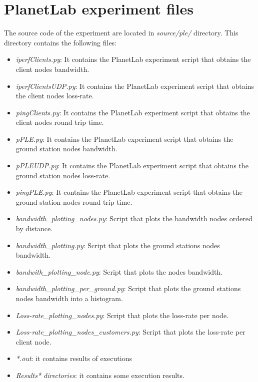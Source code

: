 \section{PlanetLab experiment files}
The source code of the  \pl experiment are located in \emph{source/ple/} directory.
This directory contains the following files:
\begin{itemize}
\item \emph{iperfClients.py}: It contains the PlanetLab experiment script that obtains the client nodes bandwidth.
\item \emph{iperfClientsUDP.py}: It contains the PlanetLab experiment script that obtains the client nodes loss-rate.
\item \emph{pingClients.py}: It contains the PlanetLab experiment script that obtains the client nodes round trip time.
\item \emph{pPLE.py}: It contains the PlanetLab experiment script that obtains the ground station nodes bandwidth.
\item \emph{pPLEUDP.py}: It contains the PlanetLab experiment script that obtains the ground station nodes loss-rate.
\item \emph{pingPLE.py}: It contains the PlanetLab experiment script that obtains the ground station nodes round trip time.
\item \emph{bandwidth\_plotting\_nodes.py}: Script that plots the bandwidth nodes ordered by distance.
\item \emph{bandwidth\_plotting.py}: Script that plots the ground stations nodes bandwidth.
\item \emph{bandwith\_plotting\_node.py}: Script that plots the nodes bandwidth.
\item \emph{bandwidth\_plotting\_per\_ground.py}: Script that plots the ground stations nodes bandwidth into a histogram.
\item \emph{Loss-rate\_plotting\_nodes.py}: Script that plots the loss-rate per node.
\item \emph{Loss-rate\_plotting\_nodes\_customers.py}: Script that plots the loss-rate per client node.
\item \emph{*.out}: it contains results of executions
\item \emph{Results* directories}: it contains some execution results.
\end{itemize}